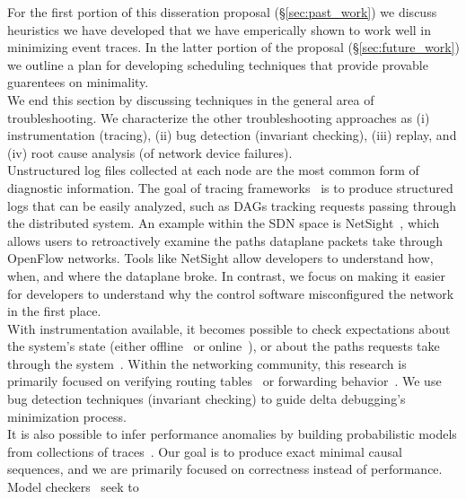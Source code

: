 For the first portion of this disseration proposal (\S\ref{sec:past_work}) we
discuss heuristics we have developed that we have emperically shown to work
well in minimizing event traces. In the latter portion of the
proposal (\S\ref{sec:future_work}) we outline a plan for
developing scheduling techniques that provide provable guarentees on
minimality.\\[0.5ex]
%
 We end this section by discussing
techniques in the general area of troubleshooting. We characterize the other troubleshooting approaches
as (i) instrumentation (tracing),
(ii) bug detection (invariant checking),
(iii) replay, and
(iv) root cause analysis (of network device failures).\\[0.5ex]
%
 Unstructured
log files collected at each node are the most common form of diagnostic information. The goal of
tracing frameworks~\cite{pip,fonseca2007x,Chen02pinpoint:problem,ndb14,barham2004using}
is to produce structured logs that can be easily analyzed, such as DAGs tracking
requests passing through the distributed system. An example within the SDN
space is NetSight~\cite{ndb14}, which
allows users to retroactively examine the paths dataplane packets
take through OpenFlow networks. Tools like NetSight allow developers to understand
how, when, and where the dataplane broke. In contrast, we focus on making it
easier for developers to understand why the control software
misconfigured the network in the first place.\\[0.5ex]
%
 With instrumentation available, it becomes possible
to check expectations about the
system's state (either offline~\cite{Liu07widschecker} or online~\cite{d3s}), or about the paths requests take through
the system~\cite{pip}. Within the networking community, this research is
primarily focused on verifying routing tables~\cite{hsa,hsa_realtime,anteater,khurshid2012veriflow}
or forwarding behavior~\cite{Zeng:2012:ATP:2413176.2413205,libra}.
We use bug detection techniques (invariant checking) to guide delta debugging's minimization
process.\\[0.5ex]
%
It is also possible to infer
performance anomalies by building probabilistic models from
collections of traces~\cite{barham2004using,Chen02pinpoint:problem}.
Our goal is to produce exact minimal causal sequences, and we are primarily focused on
correctness instead of performance.\\[0.5ex]
%
Model checkers~\cite{musuvathi2008finding,nice} seek to

